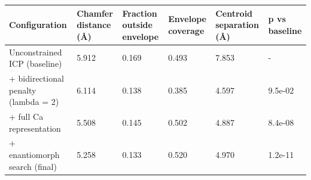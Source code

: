 \begin{tabular}{llllll}
\toprule
Configuration & Chamfer distance (Å) & Fraction outside envelope & Envelope coverage & Centroid separation (Å) & p vs baseline \\
\midrule
Unconstrained ICP (baseline) & 5.912 & 0.169 & 0.493 & 7.853 & - \\
+ bidirectional penalty (lambda = 2) & 6.114 & 0.138 & 0.385 & 4.597 & 9.5e-02 \\
+ full Ca representation & 5.508 & 0.145 & 0.502 & 4.887 & 8.4e-08 \\
+ enantiomorph search (final) & 5.258 & 0.133 & 0.520 & 4.970 & 1.2e-11 \\
\bottomrule
\end{tabular}
